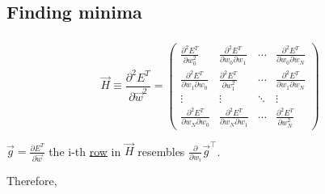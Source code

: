 \begin{frame}

\renewcommand*{\thefootnote}{\arabic{footnote}}

\end{frame}

\subsection{Finding minima}

\begin{frame}\frametitle{\subsecname}
\begin{equation}
\vec{H} \equiv \frac{\partial^2 E^T}{\partial\vec{w}^2} =
\left(\begin{array}{cccc}  
  \frac{\partial^2 E^T}{\partial w_0^2} &
  \frac{\partial^2 E^T}{\partial w_0\partial w_1} & \cdots &
  \frac{\partial^2 E^T}{\partial w_0\partial w_N} \\
  \frac{\partial^2 E^T}{\partial w_1\partial w_0} &
  \frac{\partial^2 E^T}{\partial w_1^2} & \cdots &
  \frac{\partial^2 E^T}{\partial w_1\partial w_N} \\
  \vdots & \vdots & \ddots & \vdots \\
  \frac{\partial^2 E^T}{\partial w_N\partial w_0} &
  \frac{\partial^2 E^T}{\partial w_N\partial w_1} & \cdots &
  \frac{\partial^2 E^T}{\partial w_N^2}
\end{array}\right)
\end{equation}

 $\vec g = \frac{\partial E^{T}}{\partial \vec w}$ 
\pause
{}the i-th \underline{row} in $\vec H$ resembles $\frac{\partial}{\partial w_i}\vec g^\top$.

Therefore,

\end{frame}
